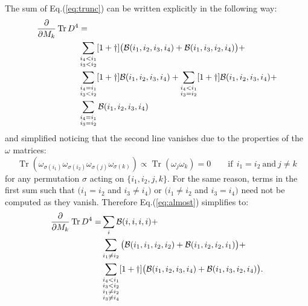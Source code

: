 \documentclass[12pt,a4paper]{article}
\DeclareMathOperator{\Tr}{Tr}
\begin{document}
The sum of Eq.(\ref{eq:trunc}) can be written explicitly in the following way:
\begin{align}\label{eq:almost}
\frac{\partial}{\partial M_k} \Tr D^4 &= \notag \\
&\sum_{\substack{i_4 < i_1 \\ i_3 < i_2}}[1+\dagger]\big(\mathcal{B}(i_1, i_2, i_3, i_4) + \mathcal{B}(i_1, i_3, i_2, i_4)\big) + \notag \\
&\sum_{\substack{i_4 = i_1 \\ i_3 < i_2}}[1+\dagger]\mathcal{B}(i_1, i_2, i_3, i_4) + \sum_{\substack{i_4 < i_1 \\ i_3 = i_2}}[1+\dagger]\mathcal{B}(i_1, i_2, i_3, i_4) + \notag \\
&\sum_{\substack{i_4 = i_1 \\ i_3 = i_2}}\mathcal{B}(i_1, i_2, i_3, i_4)
\end{align}
and simplified noticing that the second line vanishes due to the properties of the $\omega$ matrices:
\begin{equation}
\Tr(\omega_{\sigma(i_1)} \omega_{\sigma(i_2)} \omega_{\sigma(j)} \omega_{\sigma(k)}) \propto \Tr(\omega_j \omega_k) = 0 \qquad \text{if} \ \ i_1 = i_2 \ \text{and} \ j \neq k
\end{equation}
for any permutation $\sigma$ acting on $\{i_1, i_2, j, k\}$.\newline
For the same reason, terms in the first sum such that $(i_1 = i_2$ and $i_3 \neq i_4)$ or $(i_1 \neq i_2$ and $i_3 = i_4)$ need not be computed as they vanish.
Therefore Eq.(\ref{eq:almost}) simplifies to:
\begin{align}\label{eq:notquite}
\frac{\partial}{\partial M_k} \Tr D^4 =
&\sum_{i}\mathcal{B}(i, i, i, i) + \notag \\
&\sum_{i_1 \neq i_2}\big( \mathcal{B}(i_1, i_1, i_2, i_2) + \mathcal{B}(i_1, i_2, i_2, i_1) \big) + \notag \\
&\sum_{\substack{i_4 < i_1 \\ i_3 < i_2 \\ i_1 \neq i_2 \\ i_3 \neq i_4}}[1+\dagger]\big(\mathcal{B}(i_1, i_2, i_3, i_4) + \mathcal{B}(i_1, i_3, i_2, i_4)\big).
\end{align}
\end{document}
